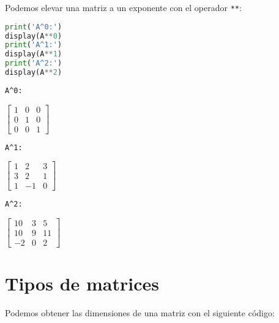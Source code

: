 \documentclass[a4,11pt]{aleph-notas}
\begin{document}
Podemos elevar una matriz a un exponente con el operador \texttt{**}:
\begin{pycodigo}
    \begin{ipynbcodigo}\begin{lstlisting}[language=Python]
print('A^0:')
display(A**0)
print('A^1:')
display(A**1)
print('A^2:')
display(A**2)
    \end{lstlisting}\end{ipynbcodigo}
    \begin{ipynbsalida}[2mm]
    \begin{Verbatim}
A^0:
    \end{Verbatim}

    $\displaystyle \left[\begin{matrix}1 & 0 & 0\\0 & 1 & 0\\0 & 0 & 1\end{matrix}\right]$

    
    \begin{Verbatim}
A^1:
    \end{Verbatim}

    $\displaystyle \left[\begin{matrix}1 & 2 & 3\\3 & 2 & 1\\1 & -1 & 0\end{matrix}\right]$

    
    \begin{Verbatim}
A^2:
    \end{Verbatim}

    $\displaystyle \left[\begin{matrix}10 & 3 & 5\\10 & 9 & 11\\-2 & 0 & 2\end{matrix}\right]$
    \end{ipynbsalida}
\end{pycodigo}
 
\section{Tipos de matrices}\label{tipos-de-matrices}

Podemos obtener las dimensiones de una matriz con el siguiente código:
\end{document}
